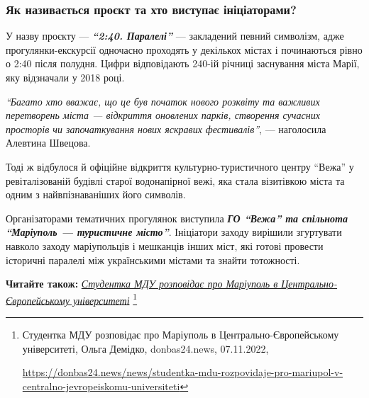 
\subsubsection{Як називається проєкт та хто виступає ініціаторами?}

У назву проєкту — \textbf{\emph{\enquote{2:40. Паралелі}}} — закладений певний символізм, адже
прогулянки-екскурсії одночасно проходять у декількох містах і починаються рівно
о 2:40 після полудня. Цифри відповідають 240-ій річниці заснування міста Марії,
яку відзначали у 2018 році.

\begin{leftbar}
\emph{\enquote{Багато хто вважає, що це був початок нового розквіту та важливих перетворень
міста — відкриття оновлених парків, створення сучасних просторів чи
започаткування нових яскравих фестивалів}}, — наголосила Алевтина Швецова.  
\end{leftbar}


Тоді ж відбулося й офіційне відкриття культурно-туристичного центру \enquote{Вежа} у
ревіталізованій будівлі старої водонапірної вежі, яка стала візитівкою міста та
одним з найвпізнаваніших його символів.


Організаторами тематичних прогулянок виступила \emph{\textbf{ГО \enquote{Вежа} та спільнота
\enquote{Маріуполь — туристичне місто}}}. Ініціатори заходу вирішили згуртувати навколо
заходу маріупольців і мешканців інших міст, які готові провести історичні
паралелі між українськими містами та знайти тотожності.


\textbf{Читайте також:} \href{https://donbas24.news/news/studentka-mdu-rozpovidaje-pro-mariupol-v-centralno-jevropeiskomu-universiteti}{\emph{Студентка МДУ розповідає про Маріуполь в Центрально-Європейському університеті}}%
\footnote{Студентка МДУ розповідає про Маріуполь в Центрально-Європейському університеті, Ольга Демідко, donbas24.news, 07.11.2022, \par%
\url{https://donbas24.news/news/studentka-mdu-rozpovidaje-pro-mariupol-v-centralno-jevropeiskomu-universiteti}%
}

